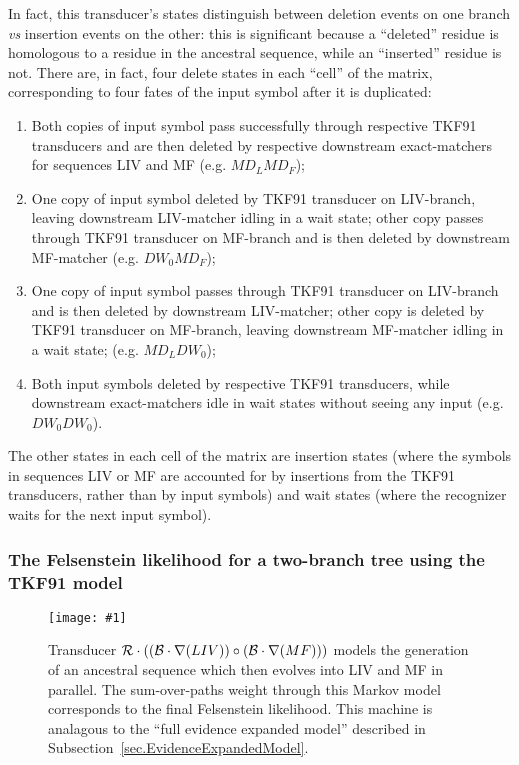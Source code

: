 \documentclass{article}
\newcommand{\secref}[1]{Subsection~\ref{sec.#1}}
\newcommand{\figlabel}[1]{\label{Figures.#1}}
\newcommand{\easyfig}[4]{
\begin{figure}
\texttt{[image: \#1]}
\caption{ \figlabel{#3} #4}
\end{figure}}
\newcommand{\widepngfig}[2]{\easyfig{#1.png}{width=\textwidth}{#1}{#2}}
\newcommand\tkf{{\cal B}}
\newcommand\tkfroot{{\cal R}}
\newcommand\fork{\circ}
\newcommand\recognize{\nabla}
\begin{document}
In fact, this transducer's states distinguish between
deletion events on one branch {\em vs} insertion events on the other:
this is significant because a ``deleted'' residue is homologous to a residue in the ancestral sequence,
while an ``inserted'' residue is not.
There are, in fact, four delete states in each ``cell'' of the matrix,
corresponding to four fates of the input symbol after it is duplicated:
\begin{enumerate}
\item Both copies of input symbol pass successfully through respective TKF91 transducers
and are then deleted by respective downstream exact-matchers for sequences LIV and MF
 (e.g. $M D_L M D_F$);
\item One copy of input symbol deleted by TKF91 transducer on LIV-branch,
leaving downstream LIV-matcher idling in a wait state;
other copy passes through TKF91 transducer on MF-branch and is then deleted by downstream MF-matcher
 (e.g. $D W_0 M D_F$);
\item One copy of input symbol passes through TKF91 transducer on LIV-branch
and is then deleted by downstream LIV-matcher;
other copy is deleted by TKF91 transducer on MF-branch,
leaving downstream MF-matcher idling in a wait state;
 (e.g. $M D_L D W_0$);
\item Both input symbols deleted by respective TKF91 transducers,
while downstream exact-matchers idle in wait states without seeing any input
 (e.g. $D W_0 D W_0$).
\end{enumerate}
The other states in each cell of the matrix are insertion states
(where the symbols in sequences LIV or MF are accounted for by insertions from the TKF91 transducers,
rather than by input symbols)
and wait states (where the recognizer waits for the next input symbol).



\subsubsection{The Felsenstein likelihood for a two-branch tree using the TKF91 model}

\widepngfig{root-fork-tkf91liv-tkf91mf}{Transducer $\tkfroot \cdot ((\tkf \cdot \recognize(LIV))\fork(\tkf \cdot \recognize(MF)))$ models the generation of an ancestral sequence which then evolves into LIV and MF in parallel.  
The sum-over-paths weight through this Markov model corresponds to the final Felsenstein likelihood. 
This machine is analagous to the ``full evidence expanded model'' described in
\secref{EvidenceExpandedModel}.  
}
\end{document}
